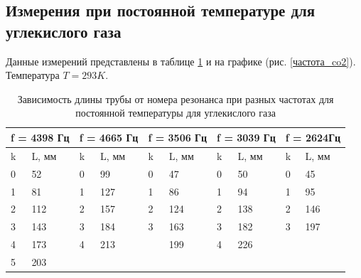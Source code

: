 \documentclass[a4paper,12pt]{article} %
\begin{document}
\subsection{Измерения при постоянной температуре для углекислого газа}
Данные измерений представлены в таблице \ref{tbl:углекислый газ} и на графике (рис. \ref{частота_co2}). Температура $T = 293 K$.

\begin{table}[h!]
\caption{Зависимость длины трубы от номера резонанса при разных частотах для постоянной температуры для углекислого газа}
\label{tbl:углекислый газ}
\begin{tabular}{|ll|ll|ll|ll|ll|}
\hline
\multicolumn{2}{|l|}{f = 4398 Гц} & \multicolumn{2}{l|}{f = 4665 Гц} & \multicolumn{2}{l|}{f = 3506 Гц} & \multicolumn{2}{l|}{f = 3039 Гц} & \multicolumn{2}{l|}{f = 2624Гц} \\ \hline
\multicolumn{1}{|l|}{k}  & L, мм  & \multicolumn{1}{l|}{k}  & L, мм  & \multicolumn{1}{l|}{k}  & L, мм  & \multicolumn{1}{l|}{k}  & L, мм  & \multicolumn{1}{l|}{k}  & L, мм \\ \hline
\multicolumn{1}{|l|}{0}  & 52     & \multicolumn{1}{l|}{0}  & 99     & \multicolumn{1}{l|}{0}  & 47     & \multicolumn{1}{l|}{0}  & 50     & \multicolumn{1}{l|}{0}  & 45    \\ \hline
\multicolumn{1}{|l|}{1}  & 81     & \multicolumn{1}{l|}{1}  & 127    & \multicolumn{1}{l|}{1}  & 86     & \multicolumn{1}{l|}{1}  & 94     & \multicolumn{1}{l|}{1}  & 95    \\ \hline
\multicolumn{1}{|l|}{2}  & 112    & \multicolumn{1}{l|}{2}  & 157    & \multicolumn{1}{l|}{2}  & 124    & \multicolumn{1}{l|}{2}  & 138    & \multicolumn{1}{l|}{2}  & 146   \\ \hline
\multicolumn{1}{|l|}{3}  & 143    & \multicolumn{1}{l|}{3}  & 184    & \multicolumn{1}{l|}{3}  & 163    & \multicolumn{1}{l|}{3}  & 182    & \multicolumn{1}{l|}{3}  & 197   \\ \hline
\multicolumn{1}{|l|}{4}  & 173    & \multicolumn{1}{l|}{4}  & 213    & \multicolumn{1}{l|}{}   & 199    & \multicolumn{1}{l|}{4}  & 226    & \multicolumn{1}{l|}{}   &       \\ \hline
\multicolumn{1}{|l|}{5}  & 203    & \multicolumn{1}{l|}{}   &        & \multicolumn{1}{l|}{}   &        & \multicolumn{1}{l|}{}   &        & \multicolumn{1}{l|}{}   &       \\ \hline
\end{tabular}
\end{table}
\end{document}
